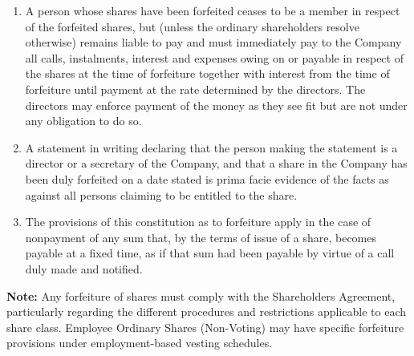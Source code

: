 \begin{enumerate}[label=(\alph*)]
    \item A person whose shares have been forfeited ceases to be a member in respect of the forfeited shares, but (unless the ordinary shareholders resolve otherwise) remains liable to pay and must immediately pay to the Company all calls, instalments, interest and expenses owing on or payable in respect of the shares at the time of forfeiture together with interest from the time of forfeiture until payment at the rate determined by the directors. The directors may enforce payment of the money as they see fit but are not under any obligation to do so.
    
    \item A statement in writing declaring that the person making the statement is a director or a secretary of the Company, and that a share in the Company has been duly forfeited on a date stated is prima facie evidence of the facts as against all persons claiming to be entitled to the share.
    
    \item The provisions of this constitution as to forfeiture apply in the case of nonpayment of any sum that, by the terms of issue of a share, becomes payable at a fixed time, as if that sum had been payable by virtue of a call duly made and notified.
\end{enumerate}

\textbf{Note:} Any forfeiture of shares must comply with the Shareholders Agreement, particularly regarding the different procedures and restrictions applicable to each share class. Employee Ordinary Shares (Non-Voting) may have specific forfeiture provisions under employment-based vesting schedules. 